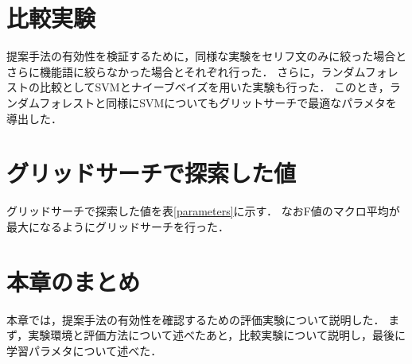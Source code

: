 \section{比較実験}
提案手法の有効性を検証するために，同様な実験をセリフ文のみに絞った場合とさらに機能語に絞らなかった場合とそれぞれ行った．
さらに，ランダムフォレストの比較としてSVMとナイーブベイズを用いた実験も行った．
このとき，ランダムフォレストと同様にSVMについてもグリットサーチで最適なパラメタを導出した．

\section{グリッドサーチで探索した値}
グリッドサーチで探索した値を表\ref{parameters}に示す．
なおF値のマクロ平均が最大になるようにグリッドサーチを行った．

\begin{table}[H]
 \centering
  \caption{グリッドサーチで探索したパラメタ}
  \vspace{0.3\baselineskip}
  \label{parameters}
\end{table}

\section{本章のまとめ}
本章では，提案手法の有効性を確認するための評価実験について説明した．
まず，実験環境と評価方法について述べたあと，比較実験について説明し，最後に学習パラメタについて述べた．

